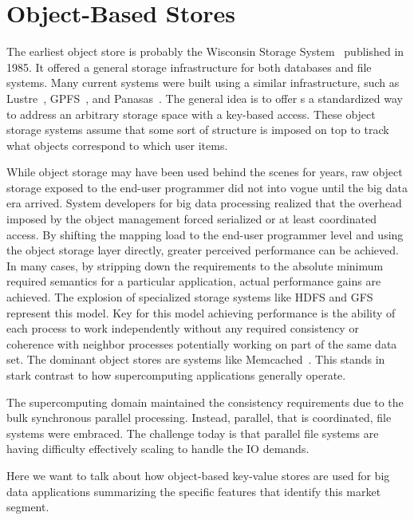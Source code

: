 \section{Object-Based Stores}\label{sec:intro}

The earliest object store is probably the Wisconsin Storage
System~\cite{1985:chou:wisconsin-storage} published in 1985. It offered a
general storage infrastructure for both databases and file systems. Many
current systems were built using a similar infrastructure, such as
Lustre~\cite{braam:2002:lustre-arch}, GPFS~\cite{schmuck:2002:gpfs}, and
Panasas~\cite{welch:2008:panasas}. The general idea is to offer s a
standardized way to address an arbitrary storage space with a key-based access.
These object storage systems assume that some sort of structure is imposed on
top to track what objects correspond to which user items.

While object storage may have been used behind the scenes for years, raw
object storage exposed to the end-user programmer did not into vogue until the
big data era arrived. System developers for big data processing realized that
the overhead imposed by the object management forced serialized or at least
coordinated access. By shifting the mapping load to the end-user programmer
level and using the object storage layer directly, greater perceived
performance can be achieved. In many cases, by stripping down the requirements
to the absolute minimum required semantics for a particular application,
actual performance gains are achieved. The explosion of specialized storage
systems like HDFS and GFS represent this model. Key for this model achieving
performance is the ability of each process to work independently without any
required consistency or coherence with neighbor processes potentially working
on part of the same data set. The dominant object stores are systems like
Memcached~\cite{fitzpatrick:2004:memcached}. This stands in stark contrast to
how supercomputing applications generally operate.

The supercomputing domain maintained the consistency requirements due to the
bulk synchronous parallel processing. Instead, parallel, that is coordinated,
file systems were embraced. The challenge today is that parallel file systems
are having difficulty effectively scaling to handle the IO demands.

Here we want to talk about how object-based key-value stores are used for big
data applications summarizing the specific features that identify this market
segment.

